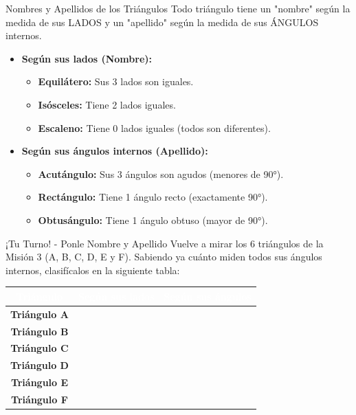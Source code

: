 \documentclass[12pt, letterpaper]{article}
\newcommand{\boxfill}[1][1.5cm]{\tcbox[on line, size=minimal, colframe=valdark!80, colback=white, boxrule=0.6pt, arc=1mm, boxsep=3pt, left=2pt, right=2pt, top=2pt, bottom=2pt]{\hspace*{#1}\vphantom{M}}}
\begin{document}
	\begin{conceptbox}{Nombres y Apellidos de los Triángulos}
		Todo triángulo tiene un "nombre" según la medida de sus LADOS y un "apellido" según la medida de sus ÁNGULOS internos.
		\begin{itemize}[itemsep=0.1cm]
			\item \textbf{Según sus lados (Nombre):}
			\begin{itemize}
				\item \textbf{Equilátero:} Sus 3 lados son iguales.
				\item \textbf{Isósceles:} Tiene 2 lados iguales.
				\item \textbf{Escaleno:} Tiene 0 lados iguales (todos son diferentes).
			\end{itemize}
			\item \textbf{Según sus ángulos internos (Apellido):}
			\begin{itemize}
				\item \textbf{Acutángulo:} Sus 3 ángulos son agudos (menores de 90°).
				\item \textbf{Rectángulo:} Tiene 1 ángulo recto (exactamente 90°).
				\item \textbf{Obtusángulo:} Tiene 1 ángulo obtuso (mayor de 90°).
			\end{itemize}
		\end{itemize}
	\end{conceptbox}
	
	\begin{espaciotrabajo}{¡Tu Turno! - Ponle Nombre y Apellido}
		Vuelve a mirar los 6 triángulos de la Misión 3 (A, B, C, D, E y F). Sabiendo ya cuánto miden todos sus ángulos internos, clasifícalos en la siguiente tabla:
		
		\vspace{0.4cm}
		\begin{center}
			\renewcommand{\arraystretch}{2}
			\begin{tabular}{|c|p{5cm}|p{5cm}|}
				\hline
				\rowcolor{valdark}
				\textcolor{white}{\textbf{Triángulo}} & \textcolor{white}{\textbf{Según sus lados}} & \textcolor{white}{\textbf{Según sus ángulos}} \\
				\hline
				\textbf{Triángulo A} & \boxfill[4cm] & \boxfill[4cm] \\
				\hline
				\textbf{Triángulo B} & \boxfill[4cm] & \boxfill[4cm] \\
				\hline
				\textbf{Triángulo C} & \boxfill[4cm] & \boxfill[4cm] \\
				\hline
				\textbf{Triángulo D} & \boxfill[4cm] & \boxfill[4cm] \\
				\hline
				\textbf{Triángulo E} & \boxfill[4cm] & \boxfill[4cm] \\
				\hline
				\textbf{Triángulo F} & \boxfill[4cm] & \boxfill[4cm] \\
				\hline
			\end{tabular}
		\end{center}
		\vspace{0.2cm}
	\end{espaciotrabajo}
	
\end{document}
